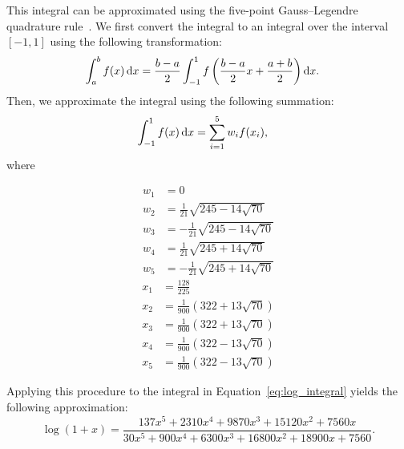 This integral can be approximated using the five-point Gauss--Legendre quadrature rule~\cite{kythe_quadrature_2002}. We first convert the integral to an integral over the interval $[-1,1]$ using the following transformation:
\begin{align*}
	\int_a^b{f(x)\mathop{}\!\mathrm{d} x}
	&= \frac{b-a}{2}\int_{-1}^{1}{f\left(\frac{b-a}{2}x+\frac{a+b}{2}\right)\mathop{}\!\mathrm{d} x}.
\end{align*}
Then, we approximate the integral using the following summation:
\begin{align*}
	\int_{-1}^{1}{f(x)\mathop{}\!\mathrm{d} x} &= \sum_{i=1}^{5}{w_if(x_i)},
\end{align*}
where
\begin{multicols}{2}
	\noindent
	\begin{align*}
		w_1 &= 0\\
		w_2 &= \frac{1}{21}\sqrt{245-14\sqrt{70}}\\
		w_3 &= -\frac{1}{21}\sqrt{245-14\sqrt{70}}\\
		w_4 &= \frac{1}{21}\sqrt{245+14\sqrt{70}}\\
		w_5 &= -\frac{1}{21}\sqrt{245+14\sqrt{70}}
	\end{align*}
	\columnbreak
	\begin{align*}
		x_1 &= \frac{128}{225}\\
		x_2 &= \frac{1}{900}\left( 322 + 13\sqrt{70}\right)\\
		x_3 &= \frac{1}{900}\left( 322 + 13\sqrt{70}\right)\\
		x_4 &= \frac{1}{900}\left( 322 - 13\sqrt{70}\right)\\
		x_5 &= \frac{1}{900}\left( 322 - 13\sqrt{70}\right)
	\end{align*}
\end{multicols}
Applying this procedure to the integral in Equation~\ref{eq:log_integral} yields the following approximation:
\begin{equation}\label{eq:standard_logarithm_quadrature}
	\log(1+x) =
	\frac{137x^5 + 2310x^4 + 9870x^3 + 15120x^2 + 7560x}
	{30x^5 + 900x^4 + 6300x^3 + 16800x^2 + 18900x + 7560}.
\end{equation}

